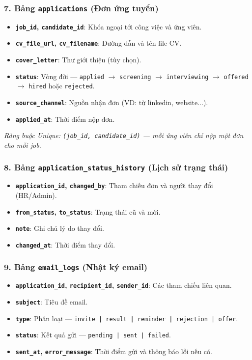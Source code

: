 \subsubsection*{7. Bảng \texttt{applications} (Đơn ứng tuyển)}
\begin{itemize}
    \item \textbf{\texttt{job\_id}, \texttt{candidate\_id}}: Khóa ngoại tới công việc và ứng viên.
    \item \textbf{\texttt{cv\_file\_url}, \texttt{cv\_filename}}: Đường dẫn và tên file CV.
    \item \textbf{\texttt{cover\_letter}}: Thư giới thiệu (tùy chọn).
    \item \textbf{\texttt{status}}: Vòng đời --- \texttt{applied} $\to$ \texttt{screening} $\to$ \texttt{interviewing} $\to$ \texttt{offered} $\to$ \texttt{hired} hoặc \texttt{rejected}.
    \item \textbf{\texttt{source\_channel}}: Nguồn nhận đơn (VD: từ linkedin, website...).
    \item \textbf{\texttt{applied\_at}}: Thời điểm nộp đơn.
\end{itemize}
\textit{Ràng buộc Unique: \texttt{(job\_id, candidate\_id)} --- mỗi ứng viên chỉ nộp một đơn cho mỗi job.}

\subsubsection*{8. Bảng \texttt{application\_status\_history} (Lịch sử trạng thái)}
\begin{itemize}
    \item \textbf{\texttt{application\_id}, \texttt{changed\_by}}: Tham chiếu đơn và người thay đổi (HR/Admin).
    \item \textbf{\texttt{from\_status}, \texttt{to\_status}}: Trạng thái cũ và mới.
    \item \textbf{\texttt{note}}: Ghi chú lý do thay đổi.
    \item \textbf{\texttt{changed\_at}}: Thời điểm thay đổi.
\end{itemize}

\subsubsection*{9. Bảng \texttt{email\_logs} (Nhật ký email)}
\begin{itemize}
    \item \textbf{\texttt{application\_id}, \texttt{recipient\_id}, \texttt{sender\_id}}: Các tham chiếu liên quan.
    \item \textbf{\texttt{subject}}: Tiêu đề email.
    \item \textbf{\texttt{type}}: Phân loại --- \texttt{invite | result | reminder | rejection | offer}.
    \item \textbf{\texttt{status}}: Kết quả gửi --- \texttt{pending | sent | failed}.
    \item \textbf{\texttt{sent\_at}, \texttt{error\_message}}: Thời điểm gửi và thông báo lỗi nếu có.
\end{itemize}

